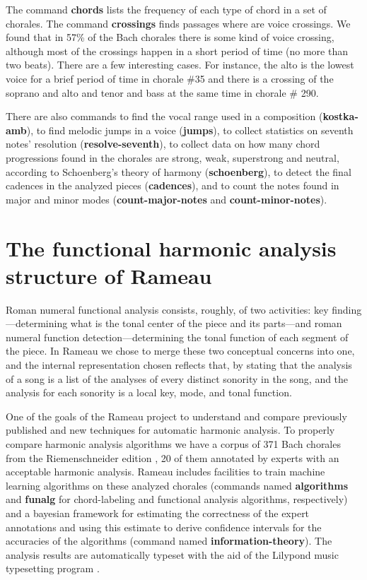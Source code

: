 \documentclass[a0paper]{sciposter}
\begin{document}
\begin{multicols}{3}
The command \textbf{chords} lists the frequency of each type of chord
in a set of chorales. The command \textbf{crossings} finds passages where
are voice crossings. We found that in 57\% of the Bach chorales there
is some kind of voice crossing, although most of the crossings happen
in a short period of time (no more than two beats). There are a few
interesting cases. For instance, the alto is the lowest voice for a
brief period of time in chorale \#35 and there is a crossing of the
soprano and alto and tenor and bass at the same time in chorale \#
290.

There are also commands to find the vocal range used in a composition
(\textbf{kostka-amb}), to find melodic jumps in a voice
(\textbf{jumps}), to collect statistics on seventh notes' resolution
(\textbf{resolve-seventh}), to collect data on how many chord
progressions found in the chorales are strong, weak, superstrong and
neutral, according to Schoenberg's theory of harmony
\cite{schoenberg83:theory} (\textbf{schoenberg}), to detect the final
cadences in the analyzed pieces (\textbf{cadences}), and to count the
notes found in major and minor modes (\textbf{count-major-notes} and
\textbf{count-minor-notes}).

\section{The functional harmonic analysis structure of Rameau}
\label{sec:problem}

Roman numeral functional analysis consists, roughly, of two
activities: key finding---determining what is the tonal center of the
piece and its parts---and roman numeral function
detection---determining the tonal function of each segment of the
piece. In Rameau we chose to merge these two conceptual concerns into one,
and the internal representation chosen reflects that, by stating that
the analysis of a song is a list of the analyses of every distinct
sonority in the song, and the analysis for each sonority is a local
key, mode, and tonal function.

One of the goals of the Rameau project to understand and compare
previously published and new techniques for automatic harmonic
analysis. To properly compare harmonic analysis algorithms we have a
corpus of 371 Bach chorales from the Riemenschneider edition
\cite{bach41:371}, 20 of them annotated by experts with an acceptable
harmonic analysis. Rameau includes facilities to train machine
learning algorithms on these analyzed chorales (commands named
\textbf{algorithms} and \textbf{funalg} for chord-labeling and
functional analysis algorithms, respectively) and a bayesian framework
for estimating the correctness of the expert annotations and using
this estimate to derive confidence intervals for the accuracies of the
algorithms (command named \textbf{information-theory}). The analysis
results are automatically typeset with the aid of the Lilypond music
typesetting program \cite{nienhuys.ea08:lilypond}.


\end{multicols}
\end{document}
